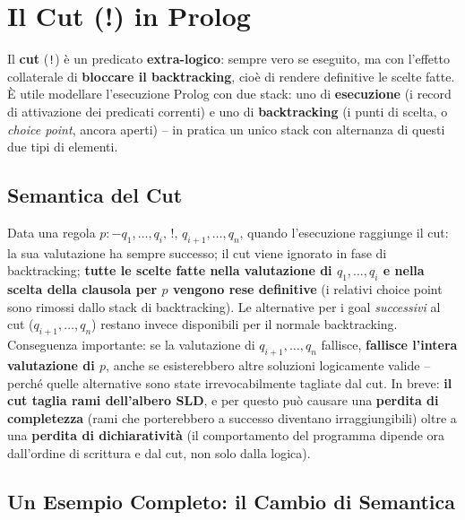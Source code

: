 \documentclass[a4paper,11pt]{article}
\begin{document}
\newpage
\section{Il Cut (!) in Prolog}

Il \textbf{cut} (\texttt{!}) è un predicato \textbf{extra-logico}: sempre vero se eseguito, ma con l'effetto collaterale di \textbf{bloccare il backtracking}, cioè di rendere definitive le scelte fatte. È utile modellare l'esecuzione Prolog con due stack: uno di \textbf{esecuzione} (i record di attivazione dei predicati correnti) e uno di \textbf{backtracking} (i punti di scelta, o \emph{choice point}, ancora aperti) -- in pratica un unico stack con alternanza di questi due tipi di elementi.

\subsection{Semantica del Cut}

Data una regola $p:-q_1,\ldots,q_i,\,!,\,q_{i+1},\ldots,q_n$, quando l'esecuzione raggiunge il cut: la sua valutazione ha sempre successo; il cut viene ignorato in fase di backtracking; \textbf{tutte le scelte fatte nella valutazione di $q_1,\ldots,q_i$ e nella scelta della clausola per $p$ vengono rese definitive} (i relativi choice point sono rimossi dallo stack di backtracking). Le alternative per i goal \emph{successivi} al cut ($q_{i+1},\ldots,q_n$) restano invece disponibili per il normale backtracking. Conseguenza importante: se la valutazione di $q_{i+1},\ldots,q_n$ fallisce, \textbf{fallisce l'intera valutazione di $p$}, anche se esisterebbero altre soluzioni logicamente valide -- perché quelle alternative sono state irrevocabilmente tagliate dal cut. In breve: \textbf{il cut taglia rami dell'albero SLD}, e per questo può causare una \textbf{perdita di completezza} (rami che porterebbero a successo diventano irraggiungibili) oltre a una \textbf{perdita di dichiaratività} (il comportamento del programma dipende ora dall'ordine di scrittura e dal cut, non solo dalla logica).

\subsection{Un Esempio Completo: il Cambio di Semantica}
\end{document}
